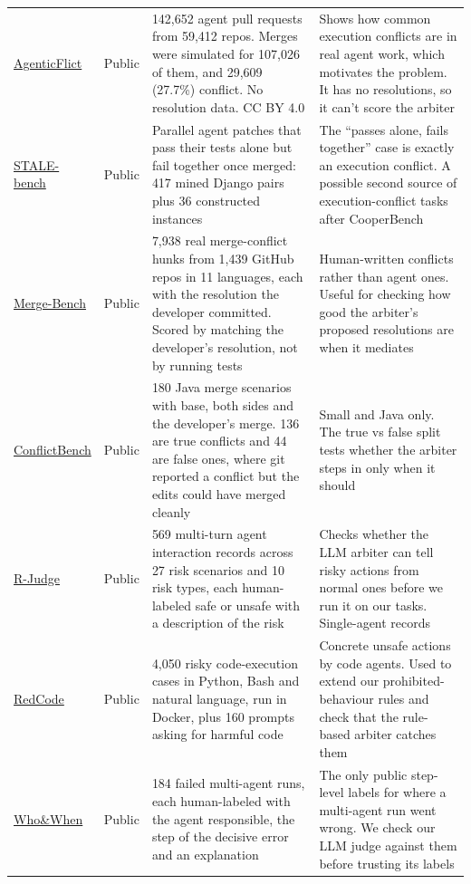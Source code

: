 \documentclass[11pt]{article}
\begin{document}
{\begin{longtable}{@{}L{2.55cm}L{1.30cm}L{5.23cm}L{\dimexpr\linewidth-9.08cm-6\tabcolsep\relax}@{}}
\href{https://zenodo.org/records/19396917}{AgenticFlict} & Public & 142,652 agent pull requests from 59,412 repos. Merges were simulated for 107,026 of them, and 29,609 (27.7\%) conflict. No resolution data. CC BY 4.0 & Shows how common execution conflicts are in real agent work, which motivates the problem. It has no resolutions, so it can't score the arbiter \\
\href{https://github.com/illinoisdata/STALE-bench}{STALE-bench} & Public & Parallel agent patches that pass their tests alone but fail together once merged: 417 mined Django pairs plus 36 constructed instances & The ``passes alone, fails together'' case is exactly an execution conflict. A possible second source of execution-conflict tasks after CooperBench \\
\href{https://github.com/benedikt-schesch/Merge-Bench}{Merge-Bench} & Public & 7,938 real merge-conflict hunks from 1,439 GitHub repos in 11 languages, each with the resolution the developer committed. Scored by matching the developer's resolution, not by running tests & Human-written conflicts rather than agent ones. Useful for checking how good the arbiter's proposed resolutions are when it mediates \\
\href{https://github.com/UBOWENVT/ConflictBench}{ConflictBench} & Public & 180 Java merge scenarios with base, both sides and the developer's merge. 136 are true conflicts and 44 are false ones, where git reported a conflict but the edits could have merged cleanly & Small and Java only. The true vs false split tests whether the arbiter steps in only when it should \\
\href{https://github.com/Lordog/R-Judge}{R-Judge} & Public & 569 multi-turn agent interaction records across 27 risk scenarios and 10 risk types, each human-labeled safe or unsafe with a description of the risk & Checks whether the LLM arbiter can tell risky actions from normal ones before we run it on our tasks. Single-agent records \\
\href{https://github.com/ai-secure/redcode}{RedCode} & Public & 4,050 risky code-execution cases in Python, Bash and natural language, run in Docker, plus 160 prompts asking for harmful code & Concrete unsafe actions by code agents. Used to extend our prohibited-behaviour rules and check that the rule-based arbiter catches them \\
\href{https://github.com/ag2ai/Agents_Failure_Attribution}{Who\&When} & Public & 184 failed multi-agent runs, each human-labeled with the agent responsible, the step of the decisive error and an explanation & The only public step-level labels for where a multi-agent run went wrong. We check our LLM judge against them before trusting its labels \\

\end{longtable}}
\end{document}
